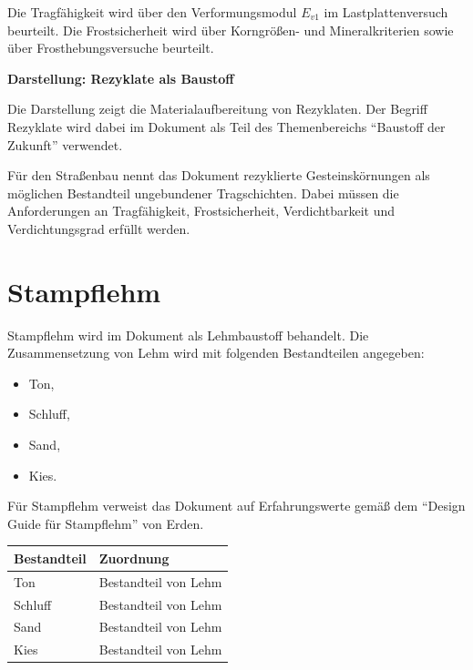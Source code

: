 \documentclass[
  12pt,
  a4paper,
  oneside
]{scrreprt}
\begin{document}
Die Tragfähigkeit wird über den Verformungsmodul $E_{v1}$ im
Lastplattenversuch beurteilt. Die Frostsicherheit wird über
Korngrößen- und Mineralkriterien sowie über Frosthebungsversuche
beurteilt.


\begin{darstellungsbox}
\textbf{Darstellung: Rezyklate als Baustoff}

Die Darstellung zeigt die Materialaufbereitung von Rezyklaten. Der
Begriff Rezyklate wird dabei im Dokument als Teil des Themenbereichs
``Baustoff der Zukunft'' verwendet.

Für den Straßenbau nennt das Dokument rezyklierte Gesteinskörnungen als
möglichen Bestandteil ungebundener Tragschichten. Dabei müssen die
Anforderungen an Tragfähigkeit, Frostsicherheit, Verdichtbarkeit und
Verdichtungsgrad erfüllt werden.
\end{darstellungsbox}

\section{Stampflehm}

Stampflehm wird im Dokument als Lehmbaustoff behandelt. Die
Zusammensetzung von Lehm wird mit folgenden Bestandteilen angegeben:

\begin{itemize}
  \item Ton,
  \item Schluff,
  \item Sand,
  \item Kies.
\end{itemize}



Für Stampflehm verweist das Dokument auf Erfahrungswerte gemäß dem
``Design Guide für Stampflehm'' von Erden.


\begin{longtable}{
  >{\raggedright\arraybackslash}p{}
  >{\raggedright\arraybackslash}p{}
}
\toprule
\textbf{Bestandteil} &
\textbf{Zuordnung} \\
\midrule
\endhead

Ton &
Bestandteil von Lehm \\

Schluff &
Bestandteil von Lehm \\

Sand &
Bestandteil von Lehm \\

Kies &
Bestandteil von Lehm \\

\bottomrule
\end{longtable}
\end{document}
